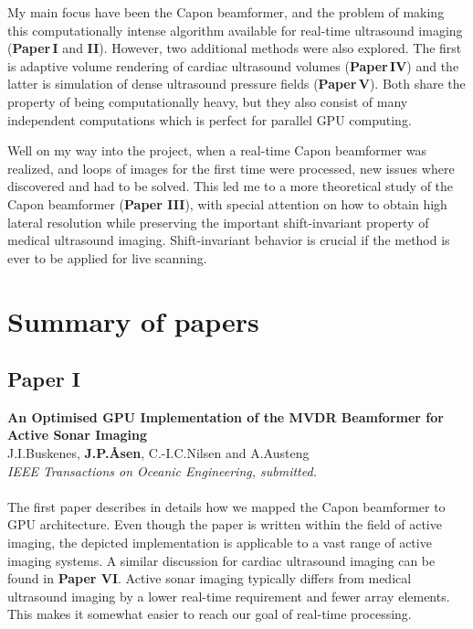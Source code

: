 My main focus have been the Capon beamformer, and the problem of making this computationally intense algorithm available for real-time ultrasound imaging (\textbf{Paper\,I} and \textbf{II}). However, two additional methods were also explored. The first is adaptive volume rendering of cardiac ultrasound volumes (\textbf{Paper\,IV}) and the latter is simulation of dense ultrasound pressure fields (\textbf{Paper\,V}). Both share the property of being computationally heavy, but they also consist of many independent computations which is perfect for parallel GPU computing. 

Well on my way into the project, when a real-time Capon beamformer was realized, and loops of images for the first time were processed, new issues where discovered and had to be solved. This led me to a more theoretical study of the Capon beamformer (\textbf{Paper III}), with special attention on how to obtain high lateral resolution while preserving the important shift-invariant property of medical ultrasound imaging. Shift-invariant behavior is crucial if the method is ever to be applied for live scanning. 



\section{Summary of papers}

\subsection{Paper I}
\textbf{An Optimised GPU Implementation of the MVDR Beamformer for Active Sonar Imaging}\\
J.\:I.\:Buskenes, \textbf{J.\:P.\:\AA{}sen}, C.-I.\:C.\:Nilsen and A.\:Austeng\\
{\it IEEE Transactions on Oceanic Engineering, submitted.}\\\\
The first paper describes in details how we mapped the Capon beamformer to GPU architecture. Even though the paper is written within the field of active  imaging, the depicted implementation is applicable to a vast range of active imaging systems. A similar discussion for cardiac ultrasound imaging can be found in \textbf{Paper VI}.  Active sonar imaging typically differs from medical ultrasound imaging by a lower real-time requirement and fewer array elements. This makes it somewhat easier to reach our goal of real-time processing. 

